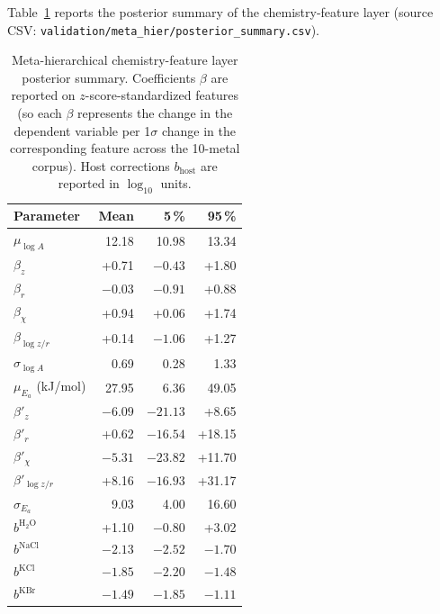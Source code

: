\documentclass[11pt]{article}
\theoremstyle{plain}
\theoremstyle{definition}
\theoremstyle{remark}
\newcommand{\Ea}{E_a}
\begin{document}
Table~\ref{tab:metahier} reports the posterior summary of the
chemistry-feature layer (source CSV:
\texttt{validation/}\allowbreak\texttt{meta\_hier/posterior\_summary.csv}).

\begin{table}[h!]
\centering
\caption{Meta-hierarchical chemistry-feature layer posterior summary.
Coefficients $\beta$ are reported on $z$-score-standardized features (so each
$\beta$ represents the change in the dependent variable per
1$\sigma$ change in the corresponding feature across the 10-metal corpus).
Host corrections $b_{\mathrm{host}}$ are reported in $\log_{10}$ units.}
\label{tab:metahier}
\small
\begin{tabular}{lrrr}
\toprule
Parameter            & Mean    & 5\,\% & 95\,\% \\
\midrule
$\mu_{\log A}$       & 12.18   & 10.98 & 13.34 \\
$\beta_{z}$          & +0.71   & $-0.43$ & +1.80 \\
$\beta_{r}$          & $-0.03$ & $-0.91$ & +0.88 \\
$\beta_{\chi}$       & +0.94   & +0.06   & +1.74 \\
$\beta_{\log z/r}$   & +0.14   & $-1.06$ & +1.27 \\
$\sigma_{\log A}$    & 0.69    & 0.28    & 1.33  \\
\midrule
$\mu_{\Ea}$ (kJ/mol) & 27.95   & 6.36    & 49.05 \\
$\beta'_{z}$         & $-6.09$ & $-21.13$ & +8.65  \\
$\beta'_{r}$         & +0.62   & $-16.54$ & +18.15 \\
$\beta'_{\chi}$      & $-5.31$ & $-23.82$ & +11.70 \\
$\beta'_{\log z/r}$  & +8.16   & $-16.93$ & +31.17 \\
$\sigma_{\Ea}$       & 9.03    & 4.00    & 16.60 \\
\midrule
$b^{\mathrm{H_2O}}$  & +1.10   & $-0.80$ & +3.02 \\
$b^{\mathrm{NaCl}}$  & $-2.13$ & $-2.52$ & $-1.70$ \\
$b^{\mathrm{KCl}}$   & $-1.85$ & $-2.20$ & $-1.48$ \\
$b^{\mathrm{KBr}}$   & $-1.49$ & $-1.85$ & $-1.11$ \\
\bottomrule
\end{tabular}
\end{table}
\end{document}

